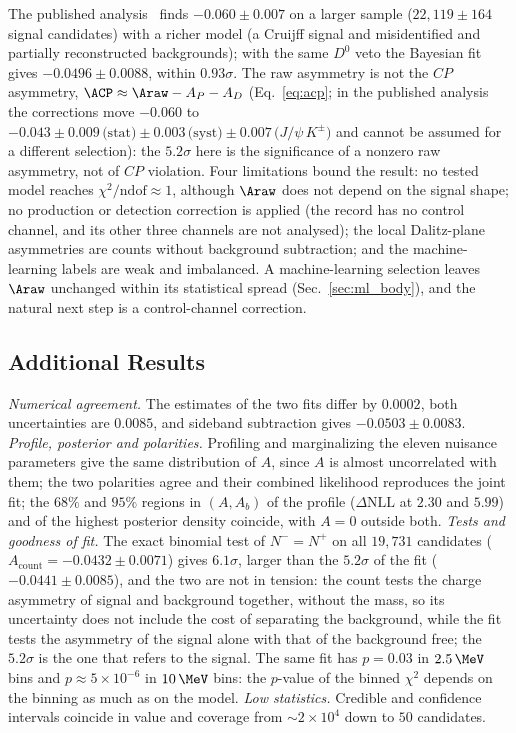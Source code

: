 \label{sec:comparison_published}
The published analysis~\cite{lhcb_cpv_2013} finds $-0.060\pm0.007$ on a larger sample ($22{,}119\pm164$ signal candidates) with a richer model (a Cruijff signal and misidentified and partially reconstructed backgrounds); with the same $D^0$ veto the Bayesian fit gives $-0.0496\pm0.0088$, within $0.93\sigma$. The raw asymmetry is not the $CP$ asymmetry, $\ACP\approx\Araw-A_P-A_D$ (Eq.~\eqref{eq:acp}; in the published analysis the corrections move $-0.060$ to $-0.043\pm0.009 \,\text{(stat)}\pm0.003\,\text{(syst)}\pm0.007\,\text{($J/\psi\, K^{\pm}$)}$ and cannot be assumed for a different selection): the $5.2\sigma$ here is the significance of a nonzero raw asymmetry, not of $CP$ violation. Four limitations bound the result: no tested model reaches $\chi^2/\mathrm{ndof}\approx1$, although $\Araw$ does not depend on the signal shape; no production or detection correction is applied (the record has no control channel, and its other three channels are not analysed); the local Dalitz-plane asymmetries are counts without background subtraction; and the machine-learning labels are weak and imbalanced. A machine-learning selection leaves $\Araw$ unchanged within its statistical spread (Sec.~\ref{sec:ml_body}), and the natural next step is a control-channel correction.
\subsection{Additional Results}
\emph{Numerical agreement.} The estimates of the two fits differ by $0.0002$, both uncertainties are $0.0085$, and sideband subtraction gives $-0.0503\pm0.0083$.
\emph{Profile, posterior and polarities.} Profiling and marginalizing the eleven nuisance parameters give the same distribution of $A$, since $A$ is almost uncorrelated with them; the two polarities agree and their combined likelihood reproduces the joint fit; the $68\%$ and $95\%$ regions in $(A,A_b)$ of the profile ($\Delta\mathrm{NLL}$ at $2.30$ and $5.99$) and of the highest posterior density coincide, with $A=0$ outside both.
\emph{Tests and goodness of fit.} The exact binomial test of $N^-=N^+$ on all $19{,}731$ candidates ($A_{\mathrm{count}}=-0.0432\pm0.0071$) gives $6.1\sigma$, larger than the $5.2\sigma$ of the fit ($-0.0441\pm0.0085$), and the two are not in tension: the count tests the charge asymmetry of signal and background together, without the mass, so its uncertainty does not include the cost of separating the background, while the fit tests the asymmetry of the signal alone with that of the background free; the $5.2\sigma$ is the one that refers to the signal. The same fit has $p=0.03$ in $2.5\,\MeV$ bins and $p\approx5\times10^{-6}$ in $10\,\MeV$ bins: the $p$-value of the binned $\chi^2$ depends on the binning as much as on the model.
\emph{Low statistics.} Credible and confidence intervals coincide in value and coverage from $\sim2\times10^4$ down to $50$ candidates.
